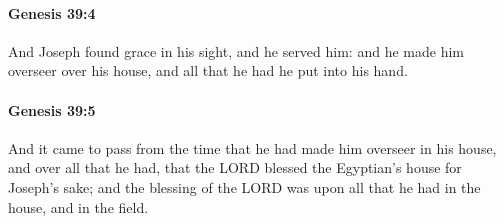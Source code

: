 		\paragraph{Genesis 39:4} %
			\label{GENESIS-39-4}

			And Joseph found grace in his sight, and he served him: and he made him overseer over his house, and all that he had he put into his hand.


		\paragraph{Genesis 39:5} %
			\label{GENESIS-39-5}

			And it came to pass from the time that he had made him overseer in his house, and over all that he had, that the LORD blessed the Egyptian's house for Joseph's sake; and the blessing of the LORD was upon all that he had in the house, and in the field.


